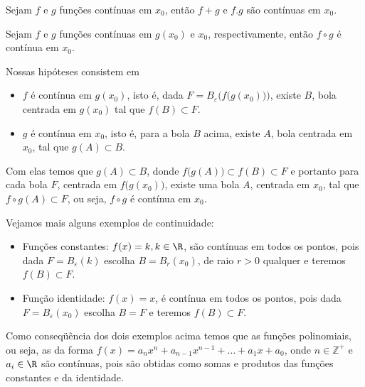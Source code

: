 \documentclass[11pt, oneside, a4paper]{gsm-l}
\begin{document}
\begin{teo}
  Sejam $f$ e $g$ funções contínuas em $x_0$, então $f+g$ e $f.g$ são
  contínuas em $x_0$.
\end{teo}

\begin{dem}
\end{dem}

\begin{teo}
  Sejam $f$ e $g$ funções contínuas em $g(x_0)$ e $x_0$,
  respectivamente, então $f \circ g$ é contínua em $x_0$.
\end{teo}

\begin{dem}
  Nossas hipóteses consistem em
  \begin{itemize}
    \item $f$ é contínua em $g\left( {x_0 } \right)$, isto é, dada
    $F=B_\varepsilon\Big(f\big(g(x_0)\big)\Big)$, existe $B$, bola
    centrada em $g(x_0)$ tal que $f(B)\subset F$.
    \item $g$ é contínua em $x_0 $, isto é, para a bola $B$ acima,
    existe $A$, bola centrada em $x_0$, tal que $g(A)\subset B$.
  \end{itemize}

  Com elas temos que $g(A)\subset B$, donde $f\big(g(A)\big)\subset
  f(B)\subset F$ e portanto para cada bola $F$, centrada em
  $f\big(g(x_0)\big)$, existe uma bola $A$, centrada em $x_0$, tal que
  $f\circ g(A)\subset F$, ou seja, $f\circ g$ é contínua em $x_0$.
\end{dem}

Vejamos mais alguns exemplos de continuidade:
\begin{itemize}
  \item Funções constantes: $f(x)=k, k\in\R$, são contínuas em todos os
  pontos, pois dada $F=B_\varepsilon(k)$ escolha $B=B_r(x_0)$, de raio
  $r>0$ qualquer e teremos $f(B)\subset F$.
  \item Função identidade: $f(x)=x$, é contínua em todos os pontos, pois
  dada $F=B_\varepsilon(x_0)$ escolha $B=F$ e teremos $f(B)\subset F$.
\end{itemize}

\begin{obs}
  Como conseqüência dos dois exemplos acima temos que as funções
  polinomiais, ou seja, as da forma
  $f(x)=a_nx^n+a_{n-1}x^{n-1}+\ldots+a_1x+a_0$, onde $n\in\mathbb{Z}^+$
  e $a_i \in \R$ são contínuas, pois são obtidas como somas e produtos
  das funções constantes e da identidade.
\end{obs}
\end{document}
